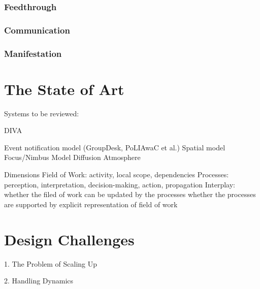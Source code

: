 \subsubsection{Feedthrough} %
\label{ssub:feedthrough}

\subsubsection{Communication} %
\label{ssub:communication}


\subsubsection{Manifestation} %
\label{ssub:manifestation}





\section{The State of Art} %
\label{sec:the_state_of_art}

Systems to be reviewed:

DIVA \cite{springerlink:10.1023/A:1008608425504}

Event notification model (GroupDesk, PoLIAwaC et al.)
Spatial model
Focus/Nimbus Model
Diffusion
Atmosphere

Dimensions
Field of Work: activity, local scope, dependencies
Processes: perception, interpretation, decision-making, action, propagation
Interplay: 
whether the filed of work can be updated by the processes
whether the processes are supported by explicit representation of field of work


\section{Design Challenges} %
\label{sec:design_challenges}
1. The Problem of Scaling Up

2. Handling Dynamics



